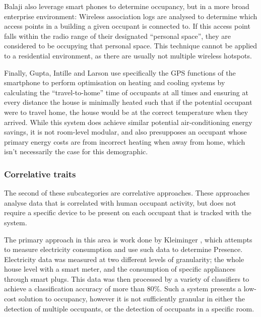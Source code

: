 \documentclass[../thesis/thesis.tex]{subfiles}
\begin{document}
Balaji \etal \cite{balaji2013sentinel} also leverage smart phones to determine occupancy, but in a more broad enterprise environment: Wireless association logs are analysed to determine which access points in a building a given occupant is connected to. If this access point falls within the radio range of their designated ``personal space'', they are considered to be occupying that personal space. This technique cannot be applied to a residential environment, as there are usually not multiple wireless hotspots.

Finally, Gupta, Intille and Larson \cite{gupta2009adding} use specifically the GPS functions of the smartphone to perform optimisation on heating and cooling systems by calculating the ``travel-to-home'' time of occupants at all times and ensuring at every distance the house is minimally heated such that if the potential occupant were to travel home, the house would be at the correct temperature when they arrived. While this system does achieve similar potential air-conditioning energy savings, it is not room-level modular, and also presupposes an occupant whose primary energy costs are from incorrect heating when away from home, which isn't necessarily the case for this demographic.

\subsubsection{Correlative traits}
\label{subsubsec:litreview:sensors:extrinsic:correlative}
The second of these subcategories are correlative approaches. These approaches analyse data that is correlated with human occupant activity, but does not require a specific device to be present on each occupant that is tracked with the system.

The primary approach in this area is work done by Kleiminger \etal \cite{kleiminger2013occupancy}, which attempts to measure electricity consumption and use such data to determine Presence. Electricity data was measured at two different levels of granularity; the whole house level with a smart meter, and the consumption of specific appliances through smart plugs. This data was then processed by a variety of classifiers to achieve a classification accuracy of more than 80\%. Such a system presents a low-cost solution to occupancy, however it is not sufficiently granular in either the detection of multiple occupants, or the detection of occupants in a specific room.

\end{document}
